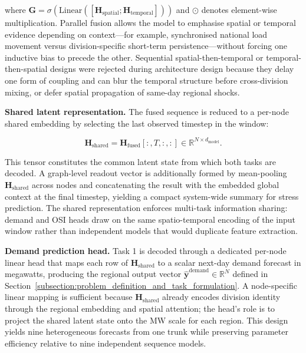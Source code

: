 where \(\mathbf{G} = \sigma(\mathrm{Linear}([\mathbf{H}_{\mathrm{spatial}}; \mathbf{H}_{\mathrm{temporal}}]))\) and \(\odot\) denotes element-wise multiplication. Parallel fusion allows the model to emphasise spatial or temporal evidence depending on context---for example, synchronised national load movement versus division-specific short-term persistence---without forcing one inductive bias to precede the other. Sequential spatial-then-temporal or temporal-then-spatial designs were rejected during architecture design because they delay one form of coupling and can blur the temporal structure before cross-division mixing, or defer spatial propagation of same-day regional shocks.

\textbf{Shared latent representation.} The fused sequence is reduced to a per-node shared embedding by selecting the last observed timestep in the window:

\[
\mathbf{H}_{\mathrm{shared}} = \mathbf{H}_{\mathrm{fused}}[:, T, :, :] \in \mathbb{R}^{N \times d_{\mathrm{model}}}.
\]

This tensor constitutes the common latent state from which both tasks are decoded. A graph-level readout vector is additionally formed by mean-pooling \(\mathbf{H}_{\mathrm{shared}}\) across nodes and concatenating the result with the embedded global context at the final timestep, yielding a compact system-wide summary for stress prediction. The shared representation enforces multi-task information sharing: demand and OSI heads draw on the same spatio-temporal encoding of the input window rather than independent models that would duplicate feature extraction.

\textbf{Demand prediction head.} Task 1 is decoded through a dedicated per-node linear head that maps each row of \(\mathbf{H}_{\mathrm{shared}}\) to a scalar next-day demand forecast in megawatts, producing the regional output vector \(\hat{\mathbf{y}}^{\mathrm{demand}} \in \mathbb{R}^N\) defined in Section~\ref{subsection:problem_definition_and_task_formulation}. A node-specific linear mapping is sufficient because \(\mathbf{H}_{\mathrm{shared}}\) already encodes division identity through the regional embedding and spatial attention; the head's role is to project the shared latent state onto the MW scale for each region. This design yields nine heterogeneous forecasts from one trunk while preserving parameter efficiency relative to nine independent sequence models.


